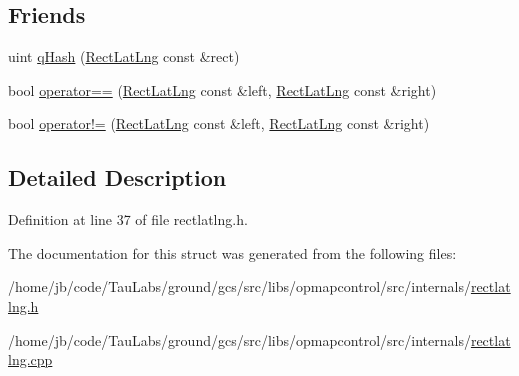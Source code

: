 \subsection*{\-Friends}
\begin{DoxyCompactItemize}
\item 
uint \hyperlink{group___o_p_map_widget_ga67b89136c8dd499f5081ea9c95aeed4b}{q\-Hash} (\hyperlink{structinternals_1_1_rect_lat_lng}{\-Rect\-Lat\-Lng} const \&rect)
\item 
bool \hyperlink{group___o_p_map_widget_ga1a6afef3d18a3e0a340d1d9dfe632a6a}{operator==} (\hyperlink{structinternals_1_1_rect_lat_lng}{\-Rect\-Lat\-Lng} const \&left, \hyperlink{structinternals_1_1_rect_lat_lng}{\-Rect\-Lat\-Lng} const \&right)
\item 
bool \hyperlink{group___o_p_map_widget_ga3259b80d8473418ef75be3a72b243e2a}{operator!=} (\hyperlink{structinternals_1_1_rect_lat_lng}{\-Rect\-Lat\-Lng} const \&left, \hyperlink{structinternals_1_1_rect_lat_lng}{\-Rect\-Lat\-Lng} const \&right)
\end{DoxyCompactItemize}


\subsection{\-Detailed \-Description}


\-Definition at line 37 of file rectlatlng.\-h.



\-The documentation for this struct was generated from the following files\-:\begin{DoxyCompactItemize}
\item 
/home/jb/code/\-Tau\-Labs/ground/gcs/src/libs/opmapcontrol/src/internals/\hyperlink{rectlatlng_8h}{rectlatlng.\-h}\item 
/home/jb/code/\-Tau\-Labs/ground/gcs/src/libs/opmapcontrol/src/internals/\hyperlink{rectlatlng_8cpp}{rectlatlng.\-cpp}\end{DoxyCompactItemize}

